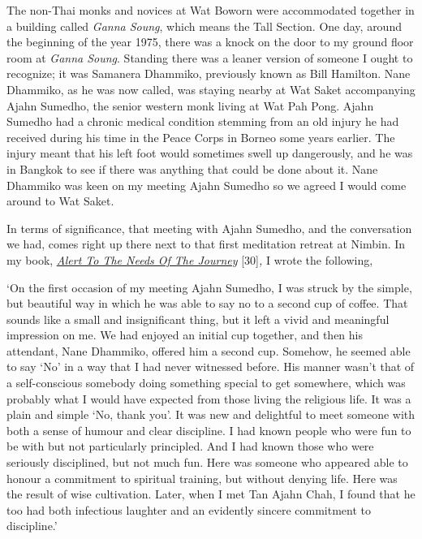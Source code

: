 The non-Thai monks and novices at Wat Boworn were accommodated together
in a building called \emph{Ganna Soung}, which means the Tall Section.
One day, around the beginning of the year 1975, there was a knock on the
door to my ground floor room at \emph{Ganna Soung}. Standing there was a
leaner version of someone I ought to recognize; it was Samanera
Dhammiko, previously known as Bill Hamilton. Nane Dhammiko, as he was
now called, was staying nearby at Wat Saket accompanying Ajahn Sumedho,
the senior western monk living at Wat Pah Pong. Ajahn Sumedho had a
chronic medical condition stemming from an old injury he had received
during his time in the Peace Corps in Borneo some years earlier. The
injury meant that his left foot would sometimes swell up dangerously,
and he was in Bangkok to see if there was anything that could be done
about it. Nane Dhammiko was keen on my meeting Ajahn Sumedho so we
agreed I would come around to Wat Saket.

In terms of significance, that meeting with Ajahn Sumedho, and the
conversation we had, comes right up there next to that first meditation
retreat at Nimbin. In my book,
\href{https://forestsangha.org/teachings/books/alert-to-the-needs-of-the-journey?language=English}{\emph{\underline{Alert
To The Needs Of The Journey}}} {[}30{]}\emph{,} I wrote the following,

`On the first occasion of my meeting Ajahn Sumedho, I was struck by the
simple, but beautiful way in which he was able to say no to a second cup
of coffee. That sounds like a small and insignificant thing, but it left
a vivid and meaningful impression on me. We had enjoyed an initial cup
together, and then his attendant, Nane Dhammiko, offered him a second
cup. Somehow, he seemed able to say `No' in a way that I had never
witnessed before. His manner wasn't that of a self-conscious somebody
doing something special to get somewhere, which was probably what I
would have expected from those living the religious life. It was a plain
and simple `No, thank you'. It was new and delightful to meet someone
with both a sense of humour and clear discipline. I had known people who
were fun to be with but not particularly principled. And I had known
those who were seriously disciplined, but not much fun. Here was someone
who appeared able to honour a commitment to spiritual training, but
without denying life. Here was the result of wise cultivation. Later,
when I met Tan Ajahn Chah, I found that he too had both infectious
laughter and an evidently sincere commitment to discipline.'

